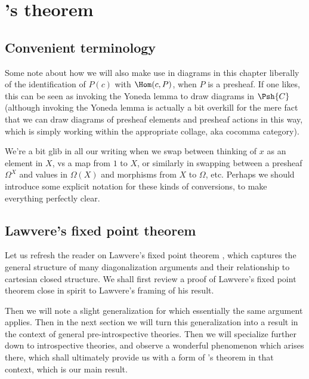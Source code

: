 \filestart

\section{\Loeb's theorem}

\subsection{Convenient terminology}
\begin{TODOblock}
Some note about how we will also make use in diagrams in this chapter liberally of the identification of $P(c)$ with $\Hom(c, P)$, when $P$ is a presheaf. If one likes, this can be seen as invoking the Yoneda lemma to draw diagrams in $\Psh{C}$ (although invoking the Yoneda lemma is actually a bit overkill for the mere fact that we can draw diagrams of presheaf elements and presheaf actions in this way, which is simply working within the appropriate collage, aka cocomma category).

We're a bit glib in all our writing when we swap between thinking of $x$ as an element in $X$, vs a map from $1$ to $X$, or similarly in swapping between a presheaf $\Omega^X$ and values in $\Omega(X)$ and morphisms from $X$ to $\Omega$, etc. Perhaps we should introduce some explicit notation for these kinds of conversions, to make everything perfectly clear.
\end{TODOblock}

\subsection{Lawvere's fixed point theorem}
Let us refresh the reader on Lawvere's fixed point theorem \autocite{lawvere1969diagonal}, which captures the general structure of many diagonalization arguments and their relationship to cartesian closed structure. We shall first review a proof of Lawvere's fixed point theorem close in spirit to Lawvere's framing of his result.

Then we will note a slight generalization for which essentially the same argument applies. Then in the next section we will turn this generalization into a result in the context of general pre-introspective theories. Then we will specialize further down to introspective theories, and observe a wonderful  phenomenon which arises there, which shall ultimately provide us with a form of \Loeb's theorem in that context, which is our main result.

